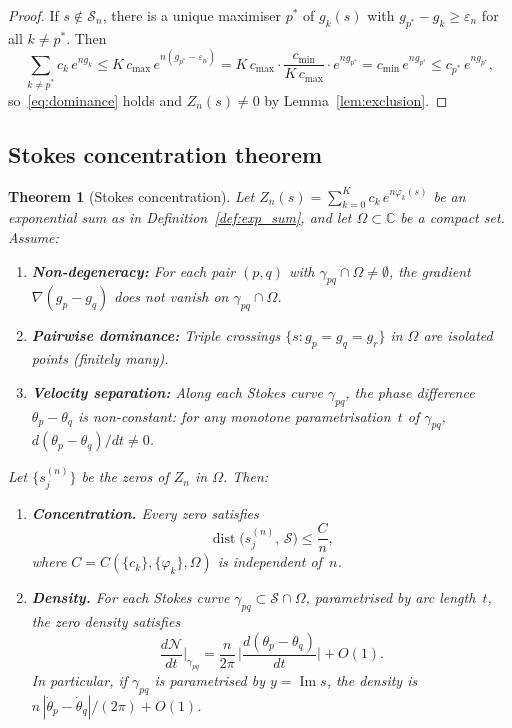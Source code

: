 \documentclass[12pt]{article}
\newtheorem{theorem}{Theorem}
\theoremstyle{definition}
\theoremstyle{remark}
\newcommand{\im}{\operatorname{Im}}
\newcommand{\dist}{\operatorname{dist}}
\begin{document}
\begin{proof}
If $s \notin \mathcal{S}_n$, there is a unique maximiser $p^*$ of
$g_k(s)$ with $g_{p^*} - g_k \geq \varepsilon_n$ for all
$k \neq p^*$.  Then
\[
\sum_{k \neq p^*} c_k\,e^{n g_k} \leq K\,c_{\max}\,e^{n(g_{p^*} - \varepsilon_n)}
= K\,c_{\max}\cdot\frac{c_{\min}}{K\,c_{\max}}\cdot e^{n g_{p^*}}
= c_{\min}\,e^{n g_{p^*}}
\leq c_{p^*}\,e^{n g_{p^*}},
\]
so~\eqref{eq:dominance} holds and $Z_n(s) \neq 0$ by
Lemma~\ref{lem:exclusion}.
\end{proof}

\subsection{Stokes concentration theorem}

\begin{theorem}[Stokes concentration]\label{thm:main}
Let $Z_n(s) = \sum_{k=0}^K c_k\,e^{n\varphi_k(s)}$ be an exponential
sum as in Definition~\ref{def:exp_sum}, and let
$\Omega \subset \mathbb{C}$ be a compact set.  Assume:
\begin{enumerate}
\item[\textup{(A1)}] \textbf{Non-degeneracy:}
  For each pair $(p,q)$ with $\gamma_{pq} \cap \Omega \neq \emptyset$,
  the gradient $\nabla(g_p - g_q)$ does not vanish on
  $\gamma_{pq} \cap \Omega$.

\item[\textup{(A2)}] \textbf{Pairwise dominance:}
  Triple crossings $\{s : g_p = g_q = g_r\}$ in $\Omega$ are
  isolated points (finitely many).

\item[\textup{(A3)}] \textbf{Velocity separation:}
  Along each Stokes curve $\gamma_{pq}$, the phase difference
  $\theta_p - \theta_q$ is non-constant: for any monotone
  parametrisation~$t$ of $\gamma_{pq}$,
  $d(\theta_p - \theta_q)/dt \neq 0$.
\end{enumerate}
Let $\{s_j^{(n)}\}$ be the zeros of $Z_n$ in $\Omega$.  Then:

\begin{enumerate}
\item[\textup{(i)}] \textbf{Concentration.}
Every zero satisfies
\[
\dist\bigl(s_j^{(n)},\, \mathcal{S}\bigr) \leq \frac{C}{n},
\]
where $C = C(\{c_k\}, \{\varphi_k\}, \Omega)$ is independent of~$n$.

\item[\textup{(ii)}] \textbf{Density.}
For each Stokes curve $\gamma_{pq} \subset \mathcal{S} \cap \Omega$,
parametrised by arc length~$t$, the zero density satisfies
\[
\frac{d\mathcal{N}}{dt}\bigg|_{\gamma_{pq}} =
\frac{n}{2\pi}\,\bigg|\frac{d(\theta_p - \theta_q)}{dt}\bigg| + O(1).
\]
In particular, if $\gamma_{pq}$ is parametrised by
$y = \im s$, the density is
$n\,|\dot\theta_p - \dot\theta_q|/(2\pi) + O(1)$.


\end{enumerate}
\end{theorem}
\end{document}
